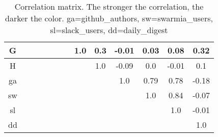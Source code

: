 \begin{table}[ht]
{\begin{tabular}{c c c c c c c c c c c c c}
G &  &  &  &  &  &  & \textcolor{cor-very-strong}{1.0} & \textcolor{cor-weak}{0.3} & \textcolor{cor-very-weak}{-0.01} & \textcolor{cor-very-weak}{0.03} & \textcolor{cor-very-weak}{0.08} & \textcolor{cor-weak}{0.32}\\ \hline
H &  &  &  &  &  &  &  & \textcolor{cor-very-strong}{1.0} & \textcolor{cor-very-weak}{-0.09} & \textcolor{cor-very-weak}{0.0} & \textcolor{cor-very-weak}{-0.01} & \textcolor{cor-very-weak}{0.1}\\ \hline
ga &  &  &  &  &  &  &  &  & \textcolor{cor-very-strong}{1.0} & \textcolor{cor-strong}{0.79} & \textcolor{cor-strong}{0.78} & \textcolor{cor-very-weak}{-0.18}\\ \hline
sw &  &  &  &  &  &  &  &  &  & \textcolor{cor-very-strong}{1.0} & \textcolor{cor-very-strong}{0.84} & \textcolor{cor-very-weak}{-0.07}\\ \hline
sl &  &  &  &  &  &  &  &  &  &  & \textcolor{cor-very-strong}{1.0} & \textcolor{cor-very-weak}{-0.01}\\ \hline
dd &  &  &  &  &  &  &  &  &  &  &  & \textcolor{cor-very-strong}{1.0}\\ \hline

\end{tabular}
}

\caption{Correlation matrix. The stronger the correlation, the darker the color. ga=github\_authors, sw=swarmia\_users, sl=slack\_users, dd=daily\_digest}
\label{tab:correlationMatrix}
\end{table}